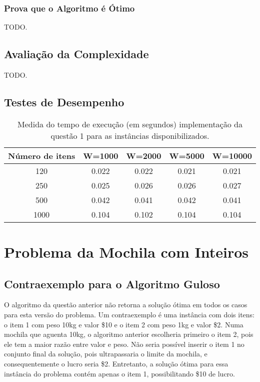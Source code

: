 \documentclass[a4paper]{article}
\begin{document}
\subsubsection{Prova que o Algoritmo é Ótimo}

TODO.

\subsection{Avaliação da Complexidade}

TODO.

\subsection{Testes de Desempenho}

\begin{table}[H]
\centering
\begin{tabular}{c|c|c|c|c}
Número de itens & W=1000 & W=2000 & W=5000 & W=10000 \\
\hline
120 & 0.022 & 0.022 & 0.021 & 0.021 \\
250 & 0.025 & 0.026 & 0.026 & 0.027 \\
500 & 0.042 & 0.041 & 0.042 & 0.041 \\
1000 & 0.104 & 0.102 & 0.104 & 0.104 \\
\end{tabular}
\caption{Medida do tempo de execução (em segundos) implementação da questão 1 para as instâncias disponibilizados.}
\label{tab:q1:bench}
\end{table}

\section{Problema da Mochila com Inteiros}

\subsection{Contraexemplo para o Algoritmo Guloso}

O algoritmo da questão anterior não retorna a solução ótima em todos os casos para esta versão do problema. Um contraexemplo é uma instância com dois itens: o item 1 com peso 10kg e valor \$10 e o item 2 com peso 1kg e valor \$2. Numa mochila que aguenta 10kg, o algoritmo anterior escolheria primeiro o item 2, pois ele tem a maior razão entre valor e peso. Não seria possível inserir o item 1 no conjunto final da solução, pois ultrapassaria o limite da mochila, e consequentemente o lucro seria \$2. Entretanto, a solução ótima para essa instância do problema contém apenas o item 1, possibilitando \$10 de lucro.
\end{document}
